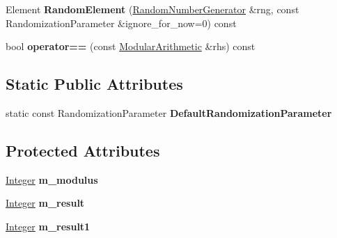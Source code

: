 \begin{DoxyCompactItemize}
\item 
\hypertarget{class_modular_arithmetic_a28cca24d8c6c897dfbe60e8cde880b5c}{
Element {\bfseries RandomElement} (\hyperlink{class_random_number_generator}{RandomNumberGenerator} \&rng, const RandomizationParameter \&ignore\_\-for\_\-now=0) const }
\label{class_modular_arithmetic_a28cca24d8c6c897dfbe60e8cde880b5c}

\item 
\hypertarget{class_modular_arithmetic_a5a84667a0345e770fd189fcaa0e33865}{
bool {\bfseries operator==} (const \hyperlink{class_modular_arithmetic}{ModularArithmetic} \&rhs) const }
\label{class_modular_arithmetic_a5a84667a0345e770fd189fcaa0e33865}

\end{DoxyCompactItemize}
\subsection*{Static Public Attributes}
\begin{DoxyCompactItemize}
\item 
\hypertarget{class_modular_arithmetic_a0bc237302baf05d7a7dcf7469eb2d331}{
static const RandomizationParameter {\bfseries DefaultRandomizationParameter}}
\label{class_modular_arithmetic_a0bc237302baf05d7a7dcf7469eb2d331}

\end{DoxyCompactItemize}
\subsection*{Protected Attributes}
\begin{DoxyCompactItemize}
\item 
\hypertarget{class_modular_arithmetic_a4abc2cc7581f81095609dd78a1ac8a01}{
\hyperlink{class_integer}{Integer} {\bfseries m\_\-modulus}}
\label{class_modular_arithmetic_a4abc2cc7581f81095609dd78a1ac8a01}

\item 
\hypertarget{class_modular_arithmetic_ab42adbb0d0c82611e3bcc2be2ac26f2f}{
\hyperlink{class_integer}{Integer} {\bfseries m\_\-result}}
\label{class_modular_arithmetic_ab42adbb0d0c82611e3bcc2be2ac26f2f}

\item 
\hypertarget{class_modular_arithmetic_a38e0eb807c66bef02cb5e1e808e10da4}{
\hyperlink{class_integer}{Integer} {\bfseries m\_\-result1}}
\label{class_modular_arithmetic_a38e0eb807c66bef02cb5e1e808e10da4}

\end{DoxyCompactItemize}


